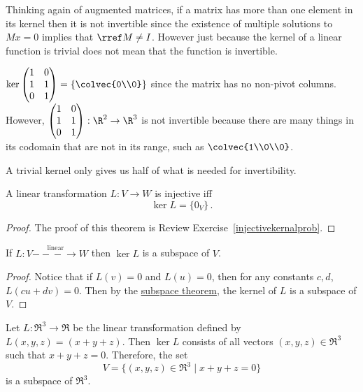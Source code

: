 Thinking again of augmented matrices, 
if a matrix has more than one element in its kernel then it is not invertible since the existence of multiple solutions to $Mx=0$ implies that $\rref M\neq I$. 
However just because the kernel of a linear function is trivial does not mean that the function is invertible. 

\begin{example}
$\ker 
\begin{pmatrix}
1&0\\
1&1\\
0&1
\end{pmatrix} =\left\{  \colvec{0\\0} \right\} $
since the matrix has no non-pivot columns. However, 
$\begin{pmatrix}
1&0\\
1&1\\
0&1
\end{pmatrix}:  \R^2 \to \R^3$
is not invertible because there are many things in its codomain that are not in its range, such as  $\colvec{1\\0\\0}$. 
\end{example}

A trivial kernel only gives us half of what is needed for invertibility.




\begin{theorem}
A linear transformation $L\colon V\rightarrow W$ is injective iff \[\ker L=\{0_V\}\, .\]
\end{theorem}

\begin{proof}
The proof of this theorem is Review Exercise~\ref{injectivekernalprob}.
\end{proof}



\begin{theorem}
If $L \colon V\stackrel{\textrm{linear}}{-\!\!\!-\!\!\!-\!\!\!\rightarrow} W$  then $\ker L$ is a subspace of $V$.
\end{theorem}

\begin{proof}
Notice that if $L(v)=0$ and $L(u)=0$, then for any constants $c,d$, $L(cu+dv)=0$.  Then by the \hyperref[subspacetheorem]{subspace theorem}, the kernel of $L$ is a subspace of $V$.
\end{proof}

\begin{example}
Let \(L \colon \Re^3 \to \Re\) be the linear transformation defined by \(L(x,y,z)=(x+y+z)\). Then \(\ker L\) consists of all vectors \((x,y,z) \in \Re^3\) such that \(x+y+z=0\). Therefore, the set
\[
V=\{(x,y,z) \in \Re^3 \mid x+y+z=0\}
\]
is a subspace of \(\Re^3\).
\end{example}

